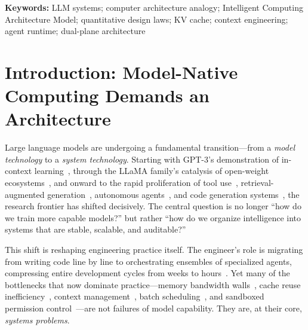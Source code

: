\documentclass[11pt,a4paper]{article}
\begin{document}
\begin{abstract}
At the quantitative level, we introduce three design laws: the \emph{Semantic Locality Law}, which characterizes the relationship between KV-cache hit rates and inference speedup; the \emph{Context Budget Law}, which captures the dual constraint of window capacity and attention decay on effective working sets; and the \emph{Agent Speedup Law}, which formalizes the diminishing returns of multi-agent collaboration.
Each law is validated against published system-level data.
Recent empirical evidence from the Anthropic 2026 agentic practices report further underscores a striking \emph{collaboration paradox}: although multi-agent setups yield diminishing marginal returns, the aggregate economic impact is substantial, with organizations reporting hundreds of thousands of hours saved and significant acceleration of engineering delivery.
We close by articulating the boundaries of the analogy, identifying fundamental differences between silicon-era and model-era architectures, and proposing a research roadmap for the coming decade.
This paper is a conceptual and survey contribution; it does not present new experimental results.
\end{abstract}

\noindent\textbf{Keywords:} LLM systems; computer architecture analogy; Intelligent Computing Architecture Model; quantitative design laws; KV cache; context engineering; agent runtime; dual-plane architecture


\section{Introduction: Model-Native Computing Demands an Architecture}
\label{sec:intro}

Large language models are undergoing a fundamental transition---from a \emph{model technology} to a \emph{system technology}.
Starting with GPT-3's demonstration of in-context learning~\cite{brown2020gpt3}, through the LLaMA family's catalysis of open-weight ecosystems~\cite{llama2023}, and onward to the rapid proliferation of tool use~\cite{schick2023toolformer}, retrieval-augmented generation~\cite{lewis2020rag}, autonomous agents~\cite{yao2023react}, and code generation systems~\cite{openhands_paper_2025,sweagent2024}, the research frontier has shifted decisively.
The central question is no longer ``how do we train more capable models?'' but rather ``how do we organize intelligence into systems that are stable, scalable, and auditable?''

This shift is reshaping engineering practice itself.
The engineer's role is migrating from writing code line by line to orchestrating ensembles of specialized agents, compressing entire development cycles from weeks to hours~\cite{anthropic2026agenticreport}.
Yet many of the bottlenecks that now dominate practice---memory bandwidth walls~\cite{gholami2024memorywall}, cache reuse inefficiency~\cite{kwon2023pagedattention}, context management~\cite{memgpt2023}, batch scheduling~\cite{orca2022}, and sandboxed permission control~\cite{ironclaw2025}---are not failures of model capability.
They are, at their core, \emph{systems problems}.
\end{document}
